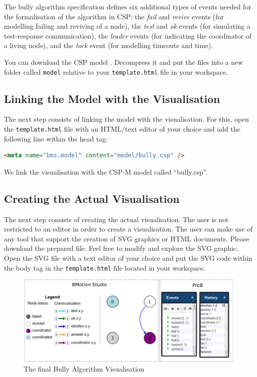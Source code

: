 The bully algorithm specification defines six additional types of events needed for the formalisation of the algorithm in CSP:
the \textit{fail} and \textit{revive} events (for modelling failing and reviving of a node), the \textit{test} and \textit{ok} events (for simulating a test-response communication), the \textit{leader} events (for indicating the coordinator of a living node), and the \textit{tock} event (for modelling timeouts and time).

You can download the CSP model .
Decompress it and put the files into a new folder called \texttt{model} relative to your \texttt{template.html} file in your workspace.

\subsection{Linking the Model with the Visualisation}

The next step consists of linking the model with the visualisation.
For this, open the \texttt{template.html} file with an HTML/text editor of your choice and add the following line within the head tag:

\begin{lstlisting}[language=html]
<meta name="bms.model" content="model/bully.csp" />
\end{lstlisting}

We link the visualisation with the CSP-M model called ``bully.csp''.

\subsection{Creating the Actual Visualisation}
\label{tutorial_csp_create_vis}

The next step consists of creating the actual visualisation.
The user is not restricted to an editor in order to create a visualisation.
The user can make use of any tool that support the creation of SVG graphics or HTML documents.
Please download the prepared  file.
Feel free to modify and explore the SVG graphic.
Open the SVG file with a text editor of your choice and put the SVG code within the body tag in the \texttt{template.html} file located in your workspace.

\begin{figure}[h!]\centering
	\includegraphics[width=16cm]{img/tutorial/runningvis}
	\caption{The final Bully Algorithm Visualisation}
	\label{fig:BullyVisState}
\end{figure}

